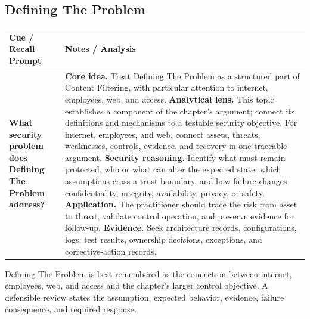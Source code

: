 \documentclass[11pt]{article}
\newcommand{\CornellHeader}{%
\rowcolor{Navy}\color{white}\bfseries Cue / Recall Prompt & \color{white}\bfseries Notes / Analysis\\\hline}
\newcommand{\CornellRow}[2]{%
\cellcolor{CueGray}\RaggedRight\textbf{#1} & \RaggedRight #2\\\hline}
\begin{document}
\subsection*{Defining The Problem}
\begin{longtable}{>{\RaggedRight\arraybackslash}p{}|>{\RaggedRight\arraybackslash}p{}}
\CornellHeader
\CornellRow{What security problem does Defining The Problem address?}{\textbf{Core idea.} Treat Defining The Problem as a structured part of Content Filtering, with particular attention to internet, employees, web, and access. \textbf{Analytical lens.} This topic establishes a component of the chapter's argument; connect its definitions and mechanisms to a testable security objective. For internet, employees, and web, connect assets, threats, weaknesses, controls, evidence, and recovery in one traceable argument. \textbf{Security reasoning.} Identify what must remain protected, who or what can alter the expected state, which assumptions cross a trust boundary, and how failure changes confidentiality, integrity, availability, privacy, or safety. \textbf{Application.} The practitioner should trace the risk from asset to threat, validate control operation, and preserve evidence for follow-up. \textbf{Evidence.} Seek architecture records, configurations, logs, test results, ownership decisions, exceptions, and corrective-action records.}
\end{longtable}
\begin{topicsummary}
Defining The Problem is best remembered as the connection between internet, employees, web, and access and the chapter's larger control objective. A defensible review states the assumption, expected behavior, evidence, failure consequence, and required response.
\end{topicsummary}
\end{document}
